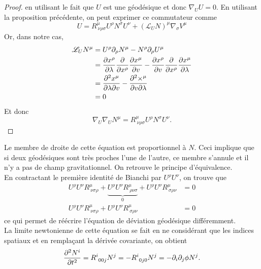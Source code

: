 \documentclass[a4paper,11pt]{report}
\theoremstyle{definition}
\theoremstyle{plain}
\theoremstyle{definition}
\theoremstyle{remark}
\newcommand{\x}{\times}
\renewcommand{\L}{\mathscr{L}}
\newcommand{\p}{\partial}
\begin{document}
\begin{proof}
                en utilisant le fait que $U$ est une géodésique et donc $\nabla_U U = 0$. En utilisant la proposition précédente, on peut exprimer ce commutateur comme
                \begin{equation}
                    [\nabla_U,\nabla_N]U = R^\mu_{~\nu\rho\sigma}U^\rho N^\sigma U^\nu + (\L_U N)^\mu \nabla_\sigma V^\mu
                \end{equation}
                Or, dans notre cas,
                \begin{align}
                    \L_U N^\mu &= U^\rho\p_\rho N^\mu-N^\rho\p_\rho U^\mu\\
                    &= \pdv{x^\rho}{\lambda}\pdv{}{x^\rho}\pdv{x^\mu}{v}-\pdv{x^\rho}{v}\pdv{}{x^\rho}\pdv{x^\mu}{\lambda}\\
                    &= \pdv{x^\mu}{\lambda}{v}-\pdv{\x^\mu}{v}{\lambda}\\
                    &= 0
                \end{align}
                Et donc
                \begin{equation}
                    \nabla_U\nabla_U N^\mu = R^\mu_{~\nu\rho\sigma}U^\rho N^\sigma U^\nu.
                \end{equation}
            \end{proof}
            Le membre de droite de cette équation est proportionnel à $N$. Ceci implique que si deux géodésiques sont très proches l'une de l'autre, ce membre s'annule et il n'y a pas de champ gravitationnel. On retrouve le principe d'équivalence.\\
        
            En contractant le première identité de Bianchi par $U^\rho U^\nu$, on trouve que 
            \begin{align}
                U^\rho U^\nu R^\mu_{~\nu\sigma\rho}+\underbrace{U^\rho U^\nu R^\mu_{~\rho\nu\sigma}}_{0}+U^\rho U^\nu R^\mu_{~\sigma\rho\nu} &= 0\\
                U^\rho U^\nu R^\mu_{~\nu\sigma\rho}+U^\rho U^\nu R^\mu_{~\sigma\rho\nu} &= 0
            \end{align}
            ce qui permet de réécrire l'équation de déviation géodésique différemment.\\
            
            La limite newtonienne de cette équation se fait en ne considérant que les indices spatiaux et en remplaçant la dérivée covariante, on obtient
            \begin{equation}
                \pdv[2]{N^i}{t} = R^i_{~00j}N^j = -R^i_{~0j0}N^j = -\p_i\p_j\phi N^j.
            \end{equation}
        
\end{document}
